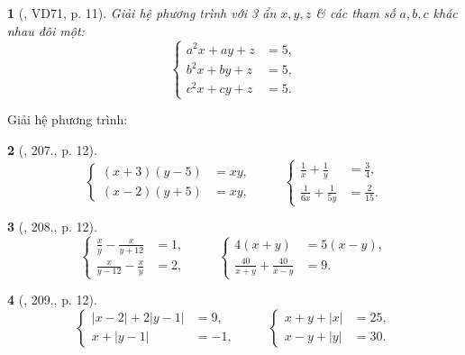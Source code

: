 \documentclass{article}
\newtheorem{baitoan}{}
\begin{document}
\begin{baitoan}[\cite{Binh_Toan_9_tap_2}, VD71, p. 11]
	Giải hệ phương trình với 3 ẩn $x,y,z$ \& các tham số $a,b,c$ khác nhau đôi một:
	\begin{equation*}
		\left\{\begin{split}
			a^2x + ay + z &= 5,\\
			b^2x + by + z &= 5,\\
			c^2x + cy + z &= 5.
		\end{split}\right.
	\end{equation*}
\end{baitoan}
Giải hệ phương trình:

\begin{baitoan}[\cite{Binh_Toan_9_tap_2}, 207., p. 12]
	\begin{equation*}
		\left\{\begin{split}
			(x + 3)(y - 5) &= xy,\\
			(x - 2)(y + 5) &= xy,
		\end{split}\right.\hspace{1cm} \left\{\begin{split}
			\frac{1}{x}	+ \frac{1}{y} &= \frac{3}{4},\\
			\frac{1}{6x} + \frac{1}{5y} &= \frac{2}{15}.
		\end{split}\right. 
	\end{equation*}
\end{baitoan}

\begin{baitoan}[\cite{Binh_Toan_9_tap_2}, 208., p. 12]
	\begin{equation*}
		\left\{\begin{split}
			\frac{x}{y} - \frac{x}{y + 12} &= 1,\\
			\frac{x}{y - 12} - \frac{x}{y} &= 2,
		\end{split}\right.\hspace{1cm} \left\{\begin{split}
			4(x + y) &= 5(x - y),\\
			\frac{40}{x + y} + \frac{40}{x - y} &= 9.
		\end{split}\right. 
	\end{equation*}
\end{baitoan}

\begin{baitoan}[\cite{Binh_Toan_9_tap_2}, 209., p. 12]
	\begin{equation*}
		\left\{\begin{split}
			|x - 2| + 2|y - 1| &= 9,\\
			x + |y - 1| &= -1,
		\end{split}\right.\hspace{1cm} \left\{\begin{split}
			x + y + |x| &= 25,\\
			x - y + |y| &= 30.
		\end{split}\right. 
	\end{equation*}
\end{baitoan}
\end{document}
